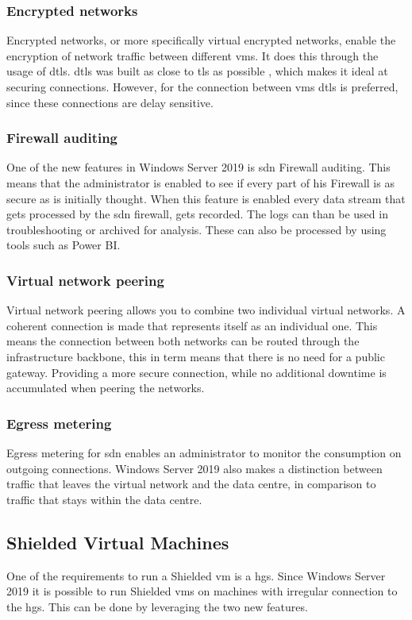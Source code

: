 \subsubsection{Encrypted networks}
\label{encrypted-networks}
Encrypted networks, or more specifically virtual encrypted networks, enable the encryption of network traffic between different \acrlong{vm}s. It does this through the usage of \acrfull{dtls}. \acrshort{dtls} was built as close to \acrshort{tls} as possible \autocite{Modadugu2004}, which makes it ideal at securing connections. However, for the connection between \acrlong{vm}s \acrshort{dtls} is preferred, since these connections are delay sensitive. 

\subsubsection{Firewall auditing}
One of the new features in Windows Server 2019 is \acrshort{sdn} Firewall auditing. This means that the administrator is enabled to see if every part of his Firewall is as secure as is initially thought. When this feature is enabled every data stream that gets processed by the \acrshort{sdn} firewall, gets recorded. The logs can than be used in troubleshooting or archived for analysis. These can also be processed by using tools such as Power BI.

\subsubsection{Virtual network peering}
Virtual network peering allows you to combine two individual virtual networks. A coherent connection is made that represents itself as an individual one. This means the connection between both networks can be routed through the infrastructure backbone, this in term means that there is no need for a public gateway. Providing a more secure connection, while no additional downtime is accumulated when peering the networks.

\subsubsection{Egress metering}
Egress metering for \acrshort{sdn} enables an administrator to monitor the consumption on outgoing connections. Windows Server 2019 also makes a distinction between traffic that leaves the virtual network and the data centre, in comparison to traffic that stays within the data centre. 

\subsection{Shielded Virtual Machines}
One of the requirements to run a Shielded \acrfull{vm} is a \acrfull{hgs}. Since Windows Server 2019 it is possible to run Shielded \acrshort{vm}s on machines with irregular connection to the \acrshort{hgs}. This can be done by leveraging the two new features. 

